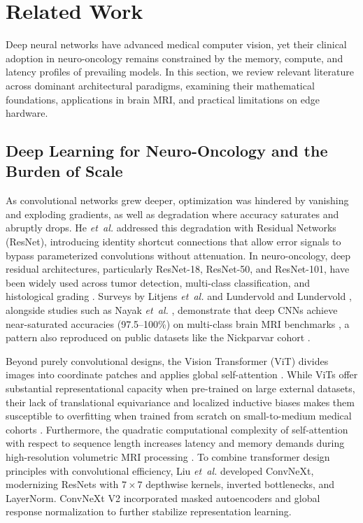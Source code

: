 \section{Related Work}
\label{sec:related_work}

Deep neural networks have advanced medical computer vision, yet their clinical adoption in neuro-oncology remains constrained by the memory, compute, and latency profiles of prevailing models. In this section, we review relevant literature across dominant architectural paradigms, examining their mathematical foundations, applications in brain MRI, and practical limitations on edge hardware.

\subsection{Deep Learning for Neuro-Oncology and the Burden of Scale}
As convolutional networks grew deeper, optimization was hindered by vanishing and exploding gradients, as well as degradation where accuracy saturates and abruptly drops. He \emph{et~al.} \cite{10} addressed this degradation with Residual Networks (ResNet), introducing identity shortcut connections that allow error signals to bypass parameterized convolutions without attenuation. In neuro-oncology, deep residual architectures, particularly ResNet-18, ResNet-50, and ResNet-101, have been widely used across tumor detection, multi-class classification, and histological grading \cite{7, 28, 38, 39}. Surveys by Litjens \emph{et~al.} \cite{7} and Lundervold and Lundervold \cite{38}, alongside studies such as Nayak \emph{et~al.} \cite{39}, demonstrate that deep CNNs achieve near-saturated accuracies (97.5--100\%) on multi-class brain MRI benchmarks \cite{39}, a pattern also reproduced on public datasets like the Nickparvar cohort \cite{26}.

Beyond purely convolutional designs, the Vision Transformer (ViT) \cite{6} divides images into coordinate patches and applies global self-attention \cite{33}. While ViTs offer substantial representational capacity when pre-trained on large external datasets, their lack of translational equivariance and localized inductive biases makes them susceptible to overfitting when trained from scratch on small-to-medium medical cohorts \cite{19}. Furthermore, the quadratic computational complexity of self-attention with respect to sequence length increases latency and memory demands during high-resolution volumetric MRI processing \cite{6, 46}. To combine transformer design principles with convolutional efficiency, Liu \emph{et~al.} \cite{24} developed ConvNeXt, modernizing ResNets with $7\times7$ depthwise kernels, inverted bottlenecks, and LayerNorm. ConvNeXt V2 \cite{34} incorporated masked autoencoders and global response normalization to further stabilize representation learning.

